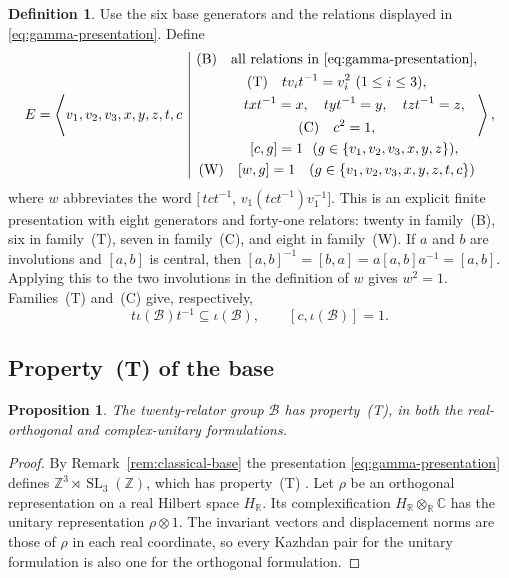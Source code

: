 \documentclass[11pt]{amsart}
\newcommand{\leanverified}[2]{\ignorespaces}
\newtheorem{proposition}[theorem]{Proposition}
\theoremstyle{definition}
\newtheorem{definition}[theorem]{Definition}
\theoremstyle{remark}
\theoremstyle{plain}
\newcommand{\SL}{\operatorname{SL}}
\begin{document}
\begin{definition}\label{def:E}
Use the six base generators and the relations displayed in
\eqref{eq:gamma-presentation}.  Define
\begin{equation}\label{eq:E}
  E=\left\langle v_1,v_2,v_3,x,y,z,t,c\ \middle|\
  \begin{gathered}
   \textup{(B)}\quad\text{all relations in \eqref{eq:gamma-presentation}},\\
   \textup{(T)}\quad tv_i t^{-1}=v_i^2\ (1\le i\le3),\\
   \phantom{\textup{(T)}\quad}
     txt^{-1}=x,\quad tyt^{-1}=y,\quad tzt^{-1}=z,\\
   \textup{(C)}\quad c^2=1,\\
   \phantom{\textup{(C)}\quad}
     [c,g]=1\ \ (g\in\{v_1,v_2,v_3,x,y,z\}),\\
   \textup{(W)}\quad [w,g]=1\quad(g\in\{v_1,v_2,v_3,x,y,z,t,c\})
  \end{gathered}\right\rangle,
\end{equation}
where $w$ abbreviates the word
$\bigl[\,tct^{-1},\,v_1(tct^{-1})v_1^{-1}\bigr]$.
This is an explicit finite presentation with eight generators and
forty-one relators: twenty in family~\textup{(B)}, six in
family~\textup{(T)}, seven in family~\textup{(C)}, and eight in
family~\textup{(W)}.
If $a$ and $b$ are involutions and $[a,b]$ is central, then
$[a,b]^{-1}=[b,a]=a[a,b]a^{-1}=[a,b]$.  Applying this to the two
involutions in the definition of $w$ gives $w^2=1$.
Families~\textup{(T)} and~\textup{(C)} give, respectively,
\leanverified{Sofic/LiteralNonMFPresentation}{GroupApproximation.LiteralNonMFPresentation.manuscriptLiteralPresentation}
\[
 t\iota(\mathcal B)t^{-1}\subseteq\iota(\mathcal B),
 \qquad [c,\iota(\mathcal B)]=1.
\]
\end{definition}

\subsection{Property~\textup{(T)} of the base}

\begin{proposition}\label{prop:literal-base-T}
The twenty-relator group $\mathcal B$ has property~\textup{(T)}, in both
the real-orthogonal and complex-unitary formulations.
\leanverified{Sofic/LiteralBaseP13PropertyTBridge}{GroupApproximation.LiteralBaseP13PropertyTBridge.manuscriptBaseHasKazhdanPropertyT}
\end{proposition}

\begin{proof}
By Remark~\ref{rem:classical-base} the presentation
\eqref{eq:gamma-presentation} defines $\mathbb Z^3\rtimes\SL_3(\mathbb
Z)$, which has property~\textup{(T)}
\cite[Corollary~1.4.16 and Theorem~1.7.1]{BHV}.  Let $\rho$ be an
orthogonal representation on a real Hilbert space $H_{\mathbb R}$.  Its
complexification $H_{\mathbb R}\otimes_{\mathbb R}\mathbb C$ has the unitary
representation $\rho\otimes1$.  The invariant vectors and displacement
norms are those of $\rho$ in each real coordinate, so every Kazhdan pair for
the unitary formulation is also one for the orthogonal formulation.
\end{proof}
\end{document}
